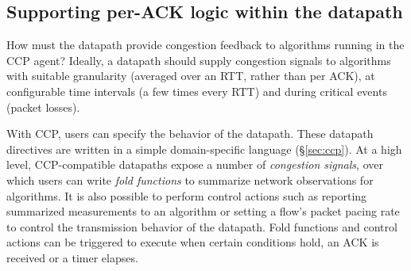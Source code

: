 \subsection{Supporting per-ACK logic within the datapath}
\label{sec:design:exercising-control-over-datapath}
\label{sec:design:restricted-datapath-functions}

How must the datapath provide congestion feedback to algorithms running in the CCP agent?
%
Ideally, a datapath should supply congestion signals to algorithms with suitable granularity (\eg averaged over an RTT, rather than per ACK), at configurable time intervals (\eg a few times every RTT) and during critical events (\eg packet losses).


With CCP, users can specify the behavior of the datapath. These datapath directives are written in a simple domain-specific language (\S\ref{sec:ccp}). At a high level, CCP-compatible datapaths expose a number of {\em congestion signals}, over which users can write {\em fold functions} to summarize network observations for algorithms. It is also possible to perform control actions such as reporting summarized measurements to an algorithm or setting a flow's packet pacing rate to control the transmission behavior of the datapath. Fold functions and control actions can be triggered to execute when certain conditions hold, \eg an ACK is received or a timer elapses.




